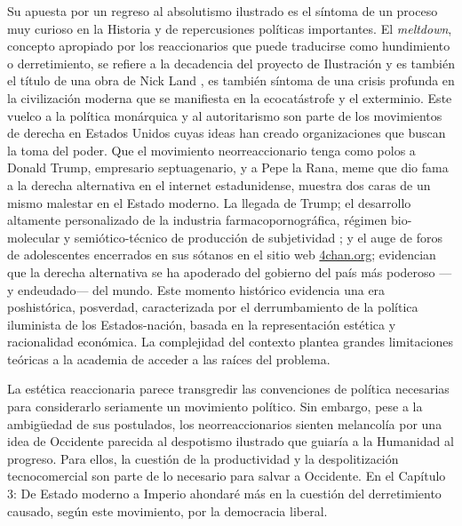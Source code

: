 Su apuesta por un regreso al absolutismo ilustrado es el síntoma de un proceso muy curioso en la Historia y de repercusiones políticas importantes. El \emph{meltdown}, concepto apropiado por los reaccionarios que puede traducirse como hundimiento o derretimiento, se refiere a la decadencia del proyecto de Ilustración y es también el título de una obra de Nick Land \autocite{landFangedNoumenaCollected2018}, es también síntoma de una crisis profunda en la civilización moderna que se manifiesta en la ecocatástrofe y el exterminio. Este vuelco a la política monárquica y al autoritarismo son parte de los movimientos de derecha en Estados Unidos cuyas ideas han creado organizaciones que buscan la toma del poder. Que el movimiento neorreaccionario tenga como polos a Donald Trump, empresario septuagenario, y a Pepe la Rana, meme que dio fama a la derecha alternativa \autocite{huiUnhappyConsciousnessNeoreactionaries2017} en el internet estadunidense, muestra dos caras de un mismo malestar en el Estado moderno. La llegada de Trump; el desarrollo altamente personalizado de la industria farmacopornográfica, régimen bio-molecular y semiótico-técnico de producción de subjetividad \autocite{preciadoTestoYonqui2008}; y el auge de foros de adolescentes encerrados en sus sótanos en el sitio web \url{4chan.org}; evidencian que la derecha alternativa se ha apoderado del gobierno del país más poderoso ---y endeudado--- del mundo. Este momento histórico evidencia una era poshistórica, posverdad, caracterizada por el derrumbamiento de la política iluminista de los Estados-nación, basada en la representación estética y racionalidad económica. La complejidad del contexto plantea grandes limitaciones teóricas a la academia de acceder a las raíces del problema.

La estética reaccionaria parece transgredir las convenciones de  política necesarias para considerarlo seriamente un movimiento político. Sin embargo, pese a la ambigüedad de sus postulados, los neorreaccionarios sienten melancolía por una idea de Occidente parecida al despotismo ilustrado que guiaría a la Humanidad al progreso. Para ellos, la cuestión de la productividad y la despolitización tecnocomercial son parte de lo necesario para salvar a Occidente. En el Capítulo 3: De Estado moderno a Imperio ahondaré más en la cuestión del derretimiento causado, según este movimiento, por la democracia liberal.

